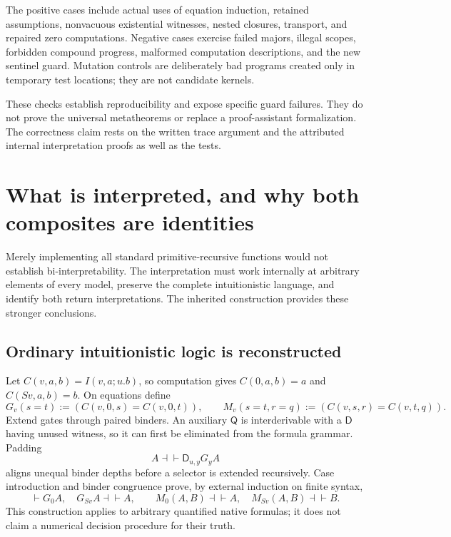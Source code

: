 \documentclass[11pt,letterpaper]{article}
\theoremstyle{definition}\newtheorem{definition}[theorem]{Definition}
\theoremstyle{remark}\newtheorem{remark}[theorem]{Remark}
\newcommand{\D}{\mathsf D}
\newcommand{\Q}{\mathsf Q}
\begin{document}
The positive cases include actual uses of equation induction,
retained assumptions, nonvacuous existential witnesses, nested closures,
transport, and repaired zero computations. Negative cases exercise
failed majors, illegal scopes, forbidden compound progress, malformed
computation descriptions, and the new sentinel guard. Mutation controls
are deliberately bad programs created only in temporary test locations;
they are not candidate kernels.

These checks establish reproducibility and expose specific guard failures.
They do not prove the universal metatheorems or replace a proof-assistant
formalization. The correctness claim rests on the written trace argument
and the attributed internal interpretation proofs as well as the tests.

\section{What is interpreted, and why both composites are identities}
\label{sec:interpretations}

Merely implementing all standard primitive-recursive functions would not
establish bi-interpretability. The interpretation must work internally
at arbitrary elements of every model, preserve the complete intuitionistic
language, and identify both return interpretations. The inherited
construction provides these stronger conclusions.

\subsection{Ordinary intuitionistic logic is reconstructed}

Let $C(v,a,b)=I(v,a;u.b)$, so computation gives
$C(0,a,b)=a$ and $C(Sv,a,b)=b$. On equations define
\[
 G_v(s=t):=(C(v,0,s)=C(v,0,t)),\qquad
 M_v(s=t,r=q):=(C(v,s,r)=C(v,t,q)).
\]
Extend gates through paired binders. An auxiliary $\Q$ is interderivable
with a $\D$ having unused witness, so it can first be eliminated from
the formula grammar. Padding
\[
 A\dashv\vdash\D_{u,y}G_yA
\]
aligns unequal binder depths before a selector is extended recursively.
Case introduction and binder congruence prove, by external induction on
finite syntax,
\[
 \vdash G_0A,\quad G_{Sv}A\dashv\vdash A,
 \qquad M_0(A,B)\dashv\vdash A,\quad M_{Sv}(A,B)\dashv\vdash B.
\]
This construction applies to arbitrary quantified native formulas;
it does not claim a numerical decision procedure for their truth.
\end{document}
